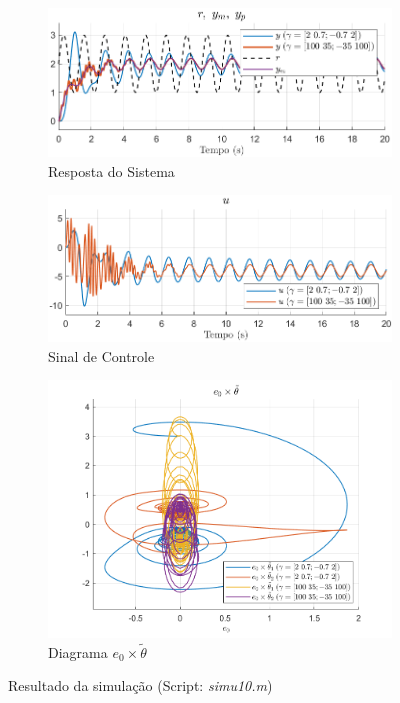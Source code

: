 \documentclass[10pt]{article}
\begin{document}
\begin{figure}[h!]
    \begin{subfigure}[b]{0.25\textwidth}
        \centering
        \includegraphics[width=\textwidth]{img/fig10c.png}
        \caption{Resposta do Sistema}
    \end{subfigure}
    \begin{subfigure}[b]{0.25\textwidth}
        \centering
        \includegraphics[width=\textwidth]{img/fig10e.png}
        \caption{Sinal de Controle}
    \end{subfigure}

    \begin{subfigure}[b]{0.25\textwidth}
        \centering
        \includegraphics[width=\textwidth]{img/fig10d.png}
        \caption{Diagrama $e_0 \times \tilde{\theta}$}
    \end{subfigure}

    \caption{Resultado da simulação (Script: \textit{simu10.m})}
    \label{fig:sim10}
\end{figure}
\end{document}
